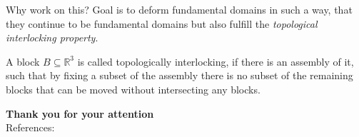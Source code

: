 \documentclass{beamer}
\theoremstyle{plain}
\newcommand\R{\mathbb R}
\begin{document}
\begin{frame}
    \begin{exampleblock}{Why work on this?}
        Goal is to deform fundamental domains in such a way, that they continue to be fundamental domains but also fulfill the \emph{topological interlocking property}.
    \end{exampleblock}\pause
    \begin{definition}
        A block $B \subseteq \R^3$ is called topologically interlocking, if there is an assembly of it, such that by fixing a subset of the assembly there is no subset of the remaining blocks that can be moved without intersecting any blocks.  
    \end{definition}
\end{frame}

\begin{frame}
    \textbf{\Large Thank you for your attention}\\ 
    \bigskip
    References:\\
    \printbibliography
\end{frame}
\end{document}
